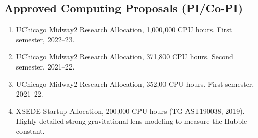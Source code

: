 \documentclass[margin, line]{res}
\begin{document}
\begin{resume}
\section{\sc Approved Computing Proposals (PI/Co-PI)}
\begin{enumerate}
\item UChicago Midway2 Research Allocation, 1,000,000 CPU hours. First semester, 2022--23.
\item UChicago Midway2 Research Allocation, 371,800 CPU hours. Second semester, 2021--22.
\item UChicago Midway2 Research Allocation, 352,00 CPU hours. First semester, 2021--22.
\item XSEDE Startup Allocation, 200,000 CPU hours (TG-AST190038, 2019). Highly-detailed strong-gravitational lens modeling to measure the Hubble constant.   
\end{enumerate}


\end{resume}
\end{document}

